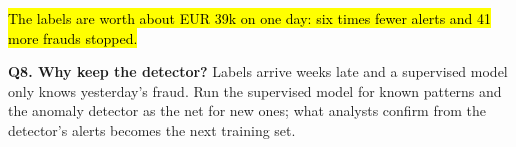 \documentclass[10pt,a4paper]{article}
\newcommand{\q}[1]{\textbf{\color{blue!50!black}#1}}
\begin{document}
\vspace{2pt}
\hl{The labels are worth about EUR 39k on one day: six times fewer alerts and 41 more frauds stopped.}

\q{Q8. Why keep the detector?} Labels arrive weeks late and a supervised model only knows yesterday's fraud. Run the
supervised model for known patterns and the anomaly detector as the net for new ones; what analysts confirm from the
detector's alerts becomes the next training set.
\end{document}
